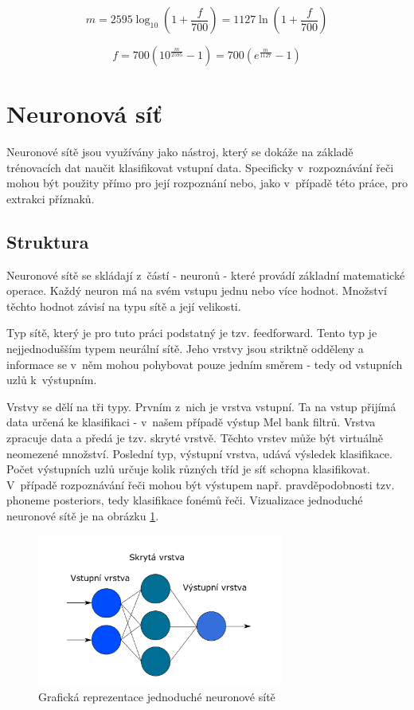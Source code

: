 \begin{equation}
m=2595\log_{10}(1+\frac{f}{700})=1127\ln(1+\frac{f}{700})
\label{eq:f_to_mel}
\end{equation}

\begin{equation}
	f=700(10^{\frac{m}{2595}}-1)=700(e^{\frac{m}{1127}}-1)
    \label{eq:mel_to_f}
\end{equation}

\section{Neuronová síť} \label{sec:nn}
Neuronové sítě jsou využívány jako nástroj, který se dokáže na základě trénovacích dat naučit klasifikovat vstupní data. Specificky v~rozpoznávání řeči mohou být použity přímo pro její rozpoznání nebo, jako v~případě této práce, pro extrakci příznaků.

\subsection{Struktura}
Neuronové sítě se skládají z~částí - neuronů - které provádí základní matematické operace. Každý neuron má na svém vstupu jednu nebo více hodnot. Množství těchto hodnot závisí na typu sítě a její velikosti. 

Typ sítě, který je pro tuto práci podstatný je tzv. feedforward. Tento typ je nejjednodušším typem neurální sítě. Jeho vrstvy jsou striktně odděleny a informace se v~něm mohou pohybovat pouze jedním směrem - tedy od vstupních uzlů k~výstupním.   

Vrstvy se dělí na tři typy. Prvním z~nich je vrstva vstupní. Ta na vstup přijímá data určená ke klasifikaci - v~našem případě výstup Mel bank filtrů. Vrstva zpracuje data a předá je tzv. skryté vrstvě. Těchto vrstev může být virtuálně neomezené množství. Poslední typ, výstupní vrstva, udává výsledek klasifikace. Počet výstupních uzlů určuje kolik různých tříd je síť schopna klasifikovat. V~případě rozpoznávání řeči mohou být výstupem např. pravděpodobnosti tzv. phoneme posteriors, tedy klasifikace fonémů řeči. Vizualizace jednoduché neuronové sítě je na obrázku \ref{fig:nn_layers}. 

\begin{figure}[H]
	\centering
		\includegraphics[height=5cm]{obrazky-figures/nn_layers.pdf}
        \caption{Grafická reprezentace jednoduché neuronové sítě}
        \label{fig:nn_layers}
\end{figure}

